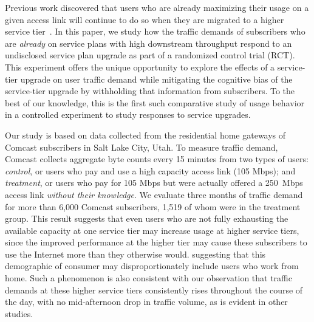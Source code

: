 
Previous work discovered that users who are already maximizing their
usage on a given access link will continue to do so when they are
migrated to a higher service tier~\cite{dasu-imc2014}. In this paper, we
study how the traffic demands of subscribers who are {\em already} on service
plans with high downstream throughput respond to an undisclosed service
plan upgrade as part of a randomized control trial (RCT). This
experiment offers the unique opportunity to explore the effects of a
service-tier upgrade on user traffic demand while mitigating the
cognitive bias of the service-tier upgrade by withholding that
information from subscribers. To the best of our knowledge, this is the
first such comparative study of usage behavior in a controlled
experiment to study responses to service upgrades.

Our study is based on data collected from the residential home gateways
of Comcast subscribers in Salt Lake City, Utah. To measure traffic
demand, Comcast collects aggregate byte counts every 15 minutes from two
types of users: {\em control}, or users who pay and use a high capacity
access link (105 Mbps); and {\em treatment}, or users who pay for 105
Mbps but were actually offered a 250~Mbps access link {\em without their
  knowledge}.  We evaluate three months of traffic demand for more than
6,000 Comcast subscribers, 1,519 of whom were in the treatment group.
  This result suggests that
 even users who are not fully exhausting the available capacity at
one service tier may increase usage at higher service tiers, since the
improved performance at the higher tier may cause these subscribers to
use the Internet more than they otherwise would. 
suggesting that this demographic of consumer may disproportionately
include users who work from home.  Such a phenomenon is also consistent
with our observation that traffic demands at these higher service
tiers consistently rises throughout the course of the day, with no
mid-afternoon drop in traffic volume, as is evident in other studies.

